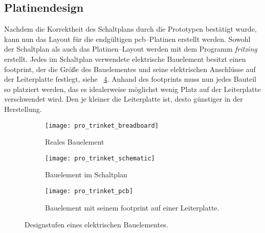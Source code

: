 \begin{comment}
------------------------------------------------------------------------------------------
+ Der initiale Aufbau erfolgt zu Evaluationszwecken auf einem Steckboard und zusätzlich auf einer separaten Lochstreifenplatine um das Zusammenspiel zweier UWB--Module zu testen. Nach dem erfolgreichen Systemtest wird aus dem erstellten Schaltplan, ein PCB--Layout erstellt, mehrere PCB--Boards bestellt und nach der Lieferung zusammengebaut und noch mal getestet.
+ Antenne
+ Aufrecht stehend
+ Batterie auf der Rückseite bietet stabilität
	+ Flachere Akkus können auch verwendet werden
+ Ansteckbares FTDI
+ Preis pro Platinengröße
- Footprint of DWM1000
+ AutoRoute
- TODO: Ground Fill with Copper
- Wikipedia: In der Antennentechnik (Satellitenfunk) bezeichnet der Azimutwinkel die horizontale Ausrichtung einer Antenne, im Gegensatz zur Elevation, die den vertikalen Winkel zwischen Horizont und Antennenrichtung angibt.
\end{comment}
\subsection{Platinendesign}

Nachdem die Korrektheit des Schaltplans durch die Prototypen bestätigt wurde, kann nun das Layout für die endgültigen \Gls{pcb}--Platinen erstellt werden. Sowohl der Schaltplan als auch das Platinen--Layout werden mit dem Programm \textit{fritzing}\cite{fritzing} erstellt. Jedes im Schaltplan verwendete elektrische Bauelement besitzt einen \Gls{footprint}, der die Größe des Bauelementes und seine elektrischen Anschlüsse auf der Leiterplatte festlegt, siehe \figurename~\ref{fig:breadboard_schematic_pcb}. Anhand des \Glspl{footprint} muss nun jedes Bauteil so platziert werden, das es idealerweise möglichst wenig Platz auf der Leiterplatte verschwendet wird. Den je kleiner die Leiterplatte ist, desto günstiger in der Herstellung.

\begin{figure}
	\begin{subfigure}[t]{0.3\textwidth}
		\centering
		\texttt{[image: pro\_trinket\_breadboard]}
		\caption{Reales Bauelement}
		\label{fig:pro_trinket_breadboard}
	\end{subfigure}
	\quad
	\begin{subfigure}[t]{0.3\textwidth}
		\centering
		\texttt{[image: pro\_trinket\_schematic]}
		\caption{Bauelement im Schaltplan}
		\label{fig:pro_trinket_schematic}
	\end{subfigure}
	\quad
	\begin{subfigure}[t]{0.3\textwidth}
		\centering
		\texttt{[image: pro\_trinket\_pcb]}
		\caption{Bauelement mit seinem \Gls{footprint} auf einer Leiterplatte.}
		\label{fig:pro_trinket_pcb}
	\end{subfigure}
	\caption{Designstufen eines elektrischen Bauelementes.}
	\label{fig:breadboard_schematic_pcb}
\end{figure}


